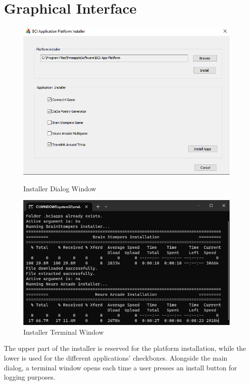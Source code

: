 \section{Graphical Interface}
\begin{figure}[H]
    \begin{minipage}[c]{0.45\linewidth}
      \includegraphics[width=\linewidth]{Graphics/Installer GUI.png}
      \caption{Installer Dialog Window}
      \end{minipage}
    \hfill
    \begin{minipage}[c]{0.45\linewidth}
      \includegraphics[width=\linewidth]{Graphics/Installer Terminal.png}
      \caption{Installer Terminal Window}
  \end{minipage}%
\end{figure}
The upper part of the installer is reserved for the platform installation, while the lower is used for the different applications' checkboxes. Alongside the main dialog, a terminal window opens each time a user presses an install button for logging purposes.

